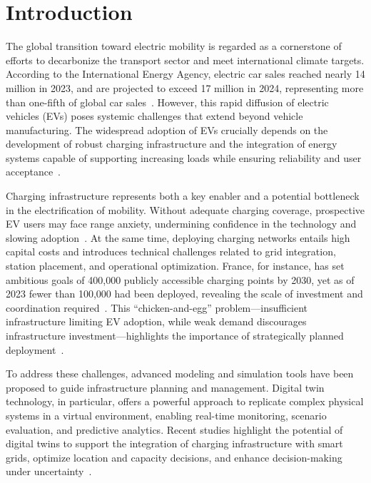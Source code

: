 \chapter{Introduction}\label{chap1}

The global transition toward electric mobility is regarded as a cornerstone of 
efforts to decarbonize the transport sector and meet international climate 
targets. According to the International Energy Agency, electric car sales 
reached nearly 14 million in 2023, and are projected to exceed 17 million 
in 2024, representing more than one-fifth of global car sales~\cite{IEA2024}. 
However, this rapid diffusion of electric vehicles (EVs) poses systemic 
challenges that extend beyond vehicle manufacturing. The widespread adoption 
of EVs crucially depends on the development of robust charging infrastructure 
and the integration of energy systems capable of supporting increasing loads 
while ensuring reliability and user acceptance~\cite{Metais2022}. 

Charging infrastructure represents both a key enabler and a potential bottleneck 
in the electrification of mobility. Without adequate charging coverage, 
prospective EV users may face range anxiety, undermining confidence in the 
technology and slowing adoption~\cite{Metais2022}. At the same time, 
deploying charging networks entails high capital costs and introduces 
technical challenges related to grid integration, station placement, and 
operational optimization. France, for instance, has set ambitious goals of 
400,000 publicly accessible charging points by 2030, yet as of 2023 fewer 
than 100,000 had been deployed, revealing the scale of investment and 
coordination required~\cite{Autorite2023}. This “chicken-and-egg” 
problem—insufficient infrastructure limiting EV adoption, while weak demand 
discourages infrastructure investment—highlights the importance of 
strategically planned deployment~\cite{Bernard2021}.

To address these challenges, advanced modeling and simulation tools have been 
proposed to guide infrastructure planning and management. Digital twin 
technology, in particular, offers a powerful approach to replicate complex 
physical systems in a virtual environment, enabling real-time monitoring, 
scenario evaluation, and predictive analytics. Recent studies highlight the 
potential of digital twins to support the integration of charging infrastructure 
with smart grids, optimize location and capacity decisions, and enhance 
decision-making under uncertainty~\cite{Charette2023, Metais2022}. 


